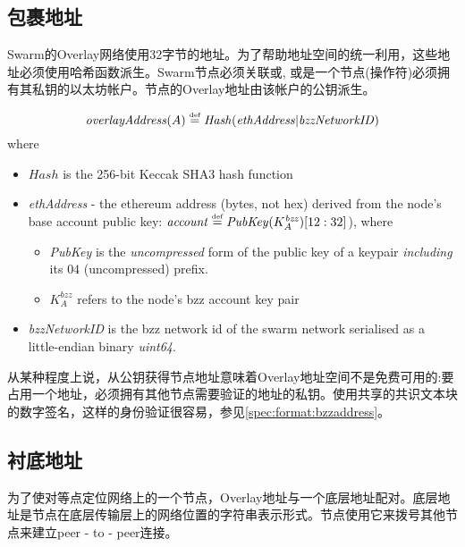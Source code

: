 \subsection{包裹地址\statusyellow}

Swarm的Overlay网络使用32字节的地址。为了帮助地址空间的统一利用，这些地址必须使用哈希函数派生。Swarm节点必须关联或, 或是一个节点(操作符)必须拥有其私钥的以太坊帐户。节点的Overlay地址由该帐户的公钥派生。 

\begin{definition}\label{def:overlay}
\begin{equation}
\mathit{overlayAddress}(A) \overset{\textrm{\tiny def}}{=} \mathit{Hash}(\mathit{ethAddress}|\mathit{bzzNetworkID})         
\end{equation}
where
\begin{itemize}
\item $\mathit{Hash}$ is the 256-bit Keccak SHA3 hash function
\item \emph{ethAddress} - the ethereum address  (bytes,  not hex) derived from the node's base account public key: $\mathit{account}\overset{\textrm{\tiny def}}{=}\mathit{PubKey}(K_A^\mathit{bzz})[12:32]$), where
    \begin{itemize}
    \item \emph{PubKey} is the \emph{uncompressed} form of the public key of a keypair \emph{including} its $04$ (uncompressed) prefix.
    \item $K_A^\mathit{bzz}$ refers to the node's bzz account key pair
    \end{itemize}
\item \emph{bzzNetworkID} is the bzz network id of the swarm network serialised as a little-endian binary \emph{uint64}.
\end{itemize}
\end{definition}

从某种程度上说，从公钥获得节点地址意味着Overlay地址空间不是免费可用的:要占用一个地址，必须拥有其他节点需要验证的地址的私钥。使用共享的共识文本块的数字签名，这样的身份验证很容易，参见\ref{spec:format:bzzaddress}。

\subsection{衬底地址\statusyellow}

为了使对等点定位网络上的一个节点，Overlay地址与一个底层地址配对。底层地址是节点在底层传输层上的网络位置的字符串表示形式。节点使用它来拨号其他节点来建立peer - to - peer连接。 

